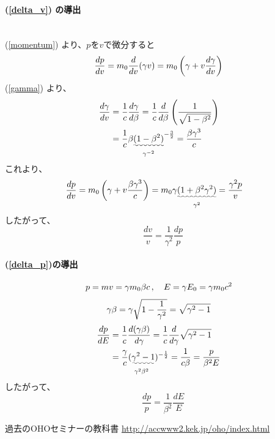 \documentclass[10pt,a4paper]{jlreq}
\begin{document}
\paragraph{(\ref{delta_v}) の導出} \leavevmode\\

(\ref{momentum}) より、$p$を$v$で微分すると
%
\begin{equation}
  \frac{dp}{dv} = m_0\frac{d}{dv}(\gamma v)
  = m_0 \left(\gamma + v \frac{d\gamma}{dv}\right) \notag
\end{equation}
%
(\ref{gamma}) より、
%
\begin{align}
  \frac{d\gamma}{dv} & = \frac{1}{c}\frac{d\gamma}{d\beta}= \frac{1}{c}\frac{d}{d\beta}\left(\frac{1}{\sqrt{1-\beta^2}}\right) \notag \\
  & = \frac{1}{c} \beta \underset{\gamma^{-2}}{\uwave{(1-\beta^2)}}^{-\frac{3}{2}} = \frac{\beta \gamma^3}{c} \notag
\end{align}
%
これより、
\begin{align}
  \frac{dp}{dv} & = m_0 \left(\gamma + v \frac{\beta \gamma^3}{c}\right)
  = m_0 \gamma \underset{\gamma^2}{\uwave{(1 + \beta^2 \gamma^2)}}
  = \frac{\gamma^2 p}{v} \notag
\end{align}
%
したがって、
%
\begin{equation}
  \quad \frac{dv}{v} = \frac{1}{\gamma^2}\frac{dp}{p}
  \label{dv_dp}
\end{equation}
%
\paragraph{(\ref{delta_p})の導出}
%
\begin{align}
  p = mv = \gamma m_0 \beta c\,  , \quad E = \gamma E_0 = \gamma m_0 c^2 \notag
\end{align}
%
\begin{equation}
  \gamma \beta = \gamma \sqrt{1-\frac{1}{\gamma^2}} \notag = \sqrt{\gamma^2 -1} \notag
\end{equation}
%
\begin{align}
  \frac{dp}{dE} & = \frac{1}{c}\frac{d(\gamma \beta)}{d\gamma} = \frac{1}{c}\frac{d}{d\gamma}\sqrt{\gamma^2 -1} \notag \\
  & = \frac{\gamma}{c} \underset{\gamma^2\beta^2}{(\uwave{\gamma^2 -1}})^{-\frac{1}{2}} = \frac{1}{c\beta}
  = \frac{p}{\beta^2 E}\notag
\end{align}
%
したがって、
%
\begin{equation}
  \quad \frac{dp}{p} = \frac{1}{\beta^2}\frac{dE}{E}
  \label{dp_de}
\end{equation}

%
\begin{thebibliography}{9}
  過去のOHOセミナーの教科書 \url{http://accwww2.kek.jp/oho/index.html}
\end{thebibliography}
%
\end{document}
